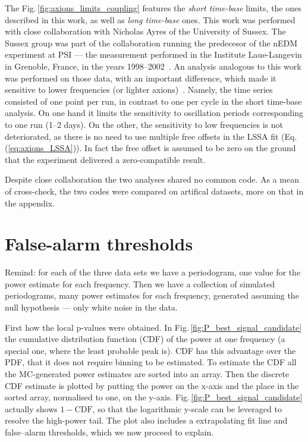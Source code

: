 The Fig.\,\ref{fig:axions_limits_coupling} features the \emph{short time-base} limits, the ones described in this work, as well as \emph{long time-base} ones.
This work was performed with close collaboration with Nicholas Ayres of the University of Sussex. The Sussex group was part of the collaboration running the predecesor of the nEDM experiment at PSI --- the measurement performed in the Institute Laue-Langevin in Grenoble, France, in the years 1998--2002~\cite{Pendlebury2015}.
An analysis analogous to this work was performed on those data, with an important difference, which made it sensitive to lower frequencies (or lighter axions)~\cite{AyresThesis}.
Namely, the time series consisted of one point per run, in contrast to one per cycle in the short time-base analysis.
On one hand it limits the sensitivity to oscillation periods corresponding to one run (1--2 days).
On the other, the sensitivity to low frequencies is not deteriorated, as there is no need to use multiple free offsets in the LSSA fit (Eq.\,(\ref{eq:axions_LSSA})). In fact the free offset is assumed to be zero on the ground that the experiment delivered a zero-compatible result.

Despite close collaboration the two analyses shared no common code. As a mean of cross-check, the two codes were compared on artifical datasets, more on that in the appendix.




\section{False-alarm thresholds}

Remind: for each of the three data sets we have a periodogram, one value for the power estimate for each frequency. Then we have a collection of simulated periodograms, many power estimates for each frequency, generated assuming the null hypothesis --- only white noise in the data.

First how the local p-values were obtained. In Fig.\,\ref{fig:P_best_signal_candidate} the cumulative distribution function (CDF)  of the power at one frequency (a special one, where the least probable peak is). CDF has this advantage over the PDF, that it does not require binning to be estimated. To estimate the CDF all the MC-generated power estimates are sorted into an array. Then the discrete CDF estimate is plotted by putting the power on the x-axis and the place in the sorted array, normalised to one, on the y-axis. Fig.\,\ref{fig:P_best_signal_candidate} actually shows $1 - \mathrm{CDF}$, so that the logarithmic y-scale can be leveraged to resolve the high-power tail. The plot also includes a extrapolating fit line and false--alarm thresholds, which we now proceed to explain.


